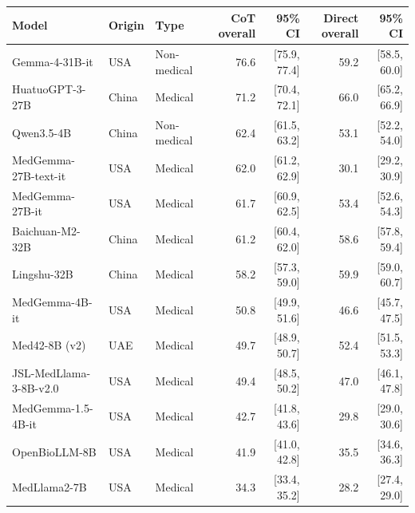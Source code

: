 \begin{tabular}{@{}lllrrrr@{}}
\toprule
Model & Origin & Type & CoT overall & 95\% CI & Direct overall & 95\% CI \\
\midrule
Gemma-4-31B-it & USA & Non-medical & 76.6 & [75.9, 77.4] & 59.2 & [58.5, 60.0] \\
HuatuoGPT-3-27B & China & Medical & 71.2 & [70.4, 72.1] & 66.0 & [65.2, 66.9] \\
Qwen3.5-4B & China & Non-medical & 62.4 & [61.5, 63.2] & 53.1 & [52.2, 54.0] \\
MedGemma-27B-text-it & USA & Medical & 62.0 & [61.2, 62.9] & 30.1 & [29.2, 30.9] \\
MedGemma-27B-it & USA & Medical & 61.7 & [60.9, 62.5] & 53.4 & [52.6, 54.3] \\
Baichuan-M2-32B & China & Medical & 61.2 & [60.4, 62.0] & 58.6 & [57.8, 59.4] \\
Lingshu-32B & China & Medical & 58.2 & [57.3, 59.0] & 59.9 & [59.0, 60.7] \\
MedGemma-4B-it & USA & Medical & 50.8 & [49.9, 51.6] & 46.6 & [45.7, 47.5] \\
Med42-8B (v2) & UAE & Medical & 49.7 & [48.9, 50.7] & 52.4 & [51.5, 53.3] \\
JSL-MedLlama-3-8B-v2.0 & USA & Medical & 49.4 & [48.5, 50.2] & 47.0 & [46.1, 47.8] \\
MedGemma-1.5-4B-it & USA & Medical & 42.7 & [41.8, 43.6] & 29.8 & [29.0, 30.6] \\
OpenBioLLM-8B & USA & Medical & 41.9 & [41.0, 42.8] & 35.5 & [34.6, 36.3] \\
MedLlama2-7B & USA & Medical & 34.3 & [33.4, 35.2] & 28.2 & [27.4, 29.0] \\
\bottomrule
\end{tabular}
